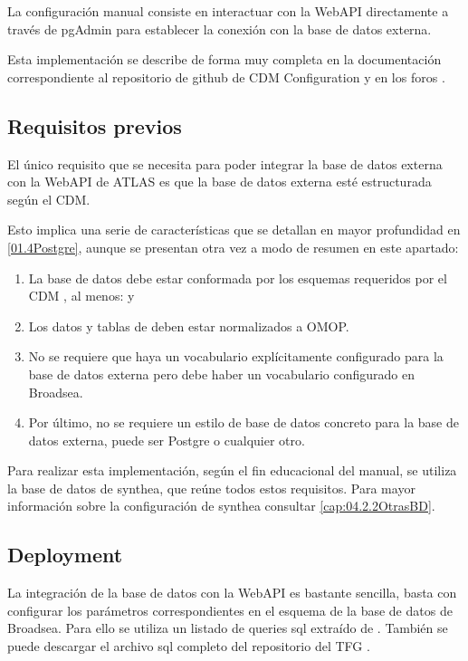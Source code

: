 La configuración manual consiste en interactuar con la WebAPI directamente a través de pgAdmin para establecer la conexión con la base de datos externa. 

Esta implementación se describe de forma muy completa en la documentación correspondiente al repositorio de github de CDM Configuration \cite{githubCDMConfig} y en los foros \cite{forumAddMSDB}\cite{forumBroadQuickStart}.

\subsection{Requisitos previos} \label{cap:04RequisitosPrevios}

El único requisito que se necesita para poder integrar la base de datos externa con la WebAPI de ATLAS es que la base de datos externa esté estructurada según el CDM.

Esto implica una serie de características que se detallan en mayor profundidad en \ref{01.4Postgre}, aunque se presentan otra vez a modo de resumen en este apartado:

\begin{enumerate}
    \item La base de datos debe estar conformada por los esquemas requeridos por el CDM \cite{githubCDMConfig}, al menos:  y 
    \item Los datos y tablas de  deben estar normalizados a OMOP.
    \item No se requiere que haya un vocabulario explícitamente configurado para la base de datos externa pero debe haber un vocabulario configurado en Broadsea.
    \item Por último, no se requiere un estilo de base de datos concreto para la base de datos externa, puede ser Postgre o cualquier otro. 
    
\end{enumerate}

Para realizar esta implementación, según el fin educacional del manual, se utiliza la base de datos de synthea, que reúne todos estos requisitos. Para mayor información sobre la configuración de synthea consultar \ref{cap:04.2.2OtrasBD}.

\subsection{Deployment}

La integración de la base de datos con la WebAPI es bastante sencilla, basta con configurar los parámetros correspondientes en el esquema  de la base de datos de Broadsea. Para ello se utiliza un listado de queries sql extraído de \cite{githubCDMConfig}. También se puede descargar el archivo sql completo del repositorio del TFG \cite{vallealonsodc}.

